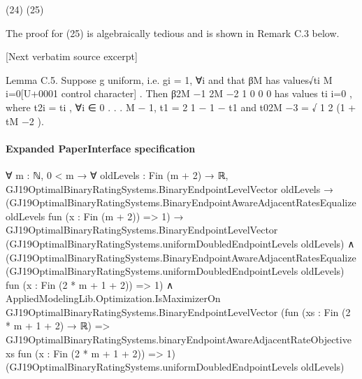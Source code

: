 \documentclass[10pt]{article}
\begin{document}
\begin{ReviewVerbatim}
(24)
(25)

The proof for (25) is algebraically tedious and is shown in Remark C.3 below.

[Next verbatim source excerpt]

Lemma C.5. Suppose g uniform, i.e. gi = 1, ∀i and that βM has values√{ti }M
i=0[U+0001 control character] . Then β2M −1
2M −2
1
0
0
0
has values {ti }i=0 , where t2i = ti , ∀i ∈ {0 . . . M − 1}, t1 = 2 1 − 1 − t1 and t02M −3 =
√
1
2 (1 + tM −2 ).
\end{ReviewVerbatim}



\paragraph{Expanded PaperInterface specification}
\begin{ReviewVerbatim}
∀ {m : ℕ},
  0 < m →
    ∀ {oldLevels : Fin (m + 2) → ℝ},
      GJ19OptimalBinaryRatingSystems.BinaryEndpointLevelVector oldLevels →
        (GJ19OptimalBinaryRatingSystems.BinaryEndpointAwareAdjacentRatesEqualize oldLevels fun (x : Fin (m + 2)) => 1) →
          GJ19OptimalBinaryRatingSystems.BinaryEndpointLevelVector
              (GJ19OptimalBinaryRatingSystems.uniformDoubledEndpointLevels oldLevels) ∧
            (GJ19OptimalBinaryRatingSystems.BinaryEndpointAwareAdjacentRatesEqualize
                (GJ19OptimalBinaryRatingSystems.uniformDoubledEndpointLevels oldLevels) fun (x : Fin (2 * m + 1 + 2)) =>
                1) ∧
              AppliedModelingLib.Optimization.IsMaximizerOn GJ19OptimalBinaryRatingSystems.BinaryEndpointLevelVector
                (fun (xs : Fin (2 * m + 1 + 2) → ℝ) =>
                  GJ19OptimalBinaryRatingSystems.binaryEndpointAwareAdjacentRateObjective xs
                    fun (x : Fin (2 * m + 1 + 2)) => 1)
                (GJ19OptimalBinaryRatingSystems.uniformDoubledEndpointLevels oldLevels)
\end{ReviewVerbatim}
\end{document}
